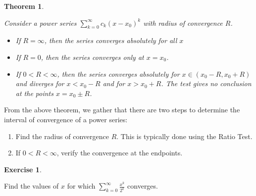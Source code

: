 \documentclass[
]{book}
\providecommand{\tightlist}{%
  \setlength{\itemsep}{0pt}\setlength{\parskip}{0pt}}
\newtheorem{theorem}{Theorem}[chapter]
\theoremstyle{definition}
\theoremstyle{definition}
\theoremstyle{definition}
\newtheorem{exercise}{Exercise}[chapter]
\theoremstyle{definition}
\theoremstyle{remark}
\begin{document}
\begin{theorem}
\protect\hypertarget{thm:unlabeled-div-238}{}\label{thm:unlabeled-div-238}

Consider a power series \(\displaystyle \sum_{k=0}^\infty c_k(x-x_0)^k\) with radius of convergence \(R\).

\begin{itemize}
\tightlist
\item
  If \(R=\infty\), then the series converges absolutely for \emph{all} \(x\)
\item
  If \(R=0\), then the series converges \emph{only} at \(x=x_0\).
\item
  If \(0<R<\infty\), then the series converges absolutely for \(x\in (x_0-R, x_0+R)\) and diverges for \(x<x_0-R\) and for \(x>x_0+R\). The test gives no conclusion at the points \(x=x_0\pm R\).
\end{itemize}

\end{theorem}

From the above theorem, we gather that there are two steps to determine the interval of convergence of a power series:

\begin{enumerate}
\def\labelenumi{\arabic{enumi}.}
\tightlist
\item
  Find the radius of convergence \(R\). This is typically done using the Ratio Test.
\item
  If \(0<R<\infty\), verify the convergence at the endpoints.
\end{enumerate}

\begin{exercise}
\protect\hypertarget{exr:unlabeled-div-239}{}\label{exr:unlabeled-div-239}

Find the values of \(x\) for which \(\displaystyle \sum_{k=0}^\infty \frac{x^k}{2^k}\) converges.

\end{exercise}
\end{document}
